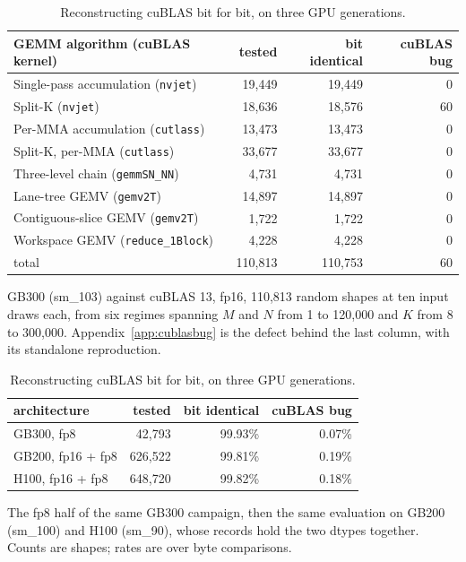 \documentclass[sigplan,nonacm]{acmart}
\begin{document}
\begin{table}[!ht]
  \centering
  \caption{Reconstructing cuBLAS bit for bit, on three GPU generations.}
  \label{tab:bitmatch}
  \footnotesize
  \setlength{\tabcolsep}{2pt}
  \begin{tabular}{lrrr}
    \toprule
    GEMM algorithm (cuBLAS kernel) & tested & bit identical & cuBLAS bug \\
    \midrule
    Single-pass accumulation (\texttt{nvjet})   &  19,449 &  19,449 &  0 \\
    Split-K (\texttt{nvjet})                    &  18,636 &  18,576 & 60 \\
    Per-MMA accumulation (\texttt{cutlass})     &  13,473 &  13,473 &  0 \\
    Split-K, per-MMA (\texttt{cutlass})         &  33,677 &  33,677 &  0 \\
    Three-level chain (\texttt{gemmSN\_NN})     &   4,731 &   4,731 &  0 \\
    Lane-tree GEMV (\texttt{gemv2T})            &  14,897 &  14,897 &  0 \\
    Contiguous-slice GEMV (\texttt{gemv2T})     &   1,722 &   1,722 &  0 \\
    Workspace GEMV (\texttt{reduce\_1Block})    &   4,228 &   4,228 &  0 \\
    \midrule
    total                                       & 110,813 & 110,753 & 60 \\
    \bottomrule
  \end{tabular}

  \vspace{2pt}
  \parbox{\columnwidth}{\footnotesize GB300 (sm\_103) against cuBLAS 13, fp16, 110,813 random
  shapes at ten input draws each, from six regimes spanning $M$ and $N$ from 1
  to 120,000 and $K$ from 8 to 300,000. Appendix~\ref{app:cublasbug} is the
  defect behind the last column, with its standalone reproduction.}

  \vspace{6pt}
  \begin{tabular}{lrrr}
    \toprule
    architecture & tested & bit identical & cuBLAS bug \\
    \midrule
    GB300, fp8        &  42,793 & 99.93\% & 0.07\% \\
    GB200, fp16 + fp8 & 626,522 & 99.81\% & 0.19\% \\
    H100, fp16 + fp8  & 648,720 & 99.82\% & 0.18\% \\
    \bottomrule
  \end{tabular}

  \vspace{2pt}
  \parbox{\columnwidth}{\footnotesize The fp8 half of the same GB300 campaign, then the same
  evaluation on GB200 (sm\_100) and H100 (sm\_90), whose records hold the two
  dtypes together. Counts are shapes; rates are over byte comparisons.}
\end{table}
\end{document}
